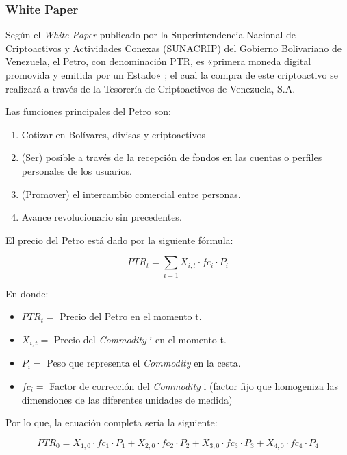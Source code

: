 \documentclass[12pt,a4paper,twoside]{book}
\begin{document}
\subsubsection{White Paper}
Según el \textit{White Paper} publicado por la Superintendencia Nacional de Criptoactivos y Actividades Conexas (SUNACRIP) del Gobierno Bolivariano de Venezuela, el Petro, con denominación PTR, es «primera moneda digital promovida y emitida por un Estado» \cite[pág. 1]{petro:whitepaper}; el cual la compra de este criptoactivo se realizará a través de la Tesorería de Criptoactivos de Venezuela, S.A.

Las funciones principales del Petro son:

\begin{enumerate}
\item Cotizar en Bolívares, divisas y criptoactivos
\item (Ser) posible a través de la recepción de fondos en las cuentas o perfiles personales de los usuarios.
\item (Promover) el intercambio comercial entre personas.
\item Avance revolucionario sin precedentes. \cite[pág. 4]{petro:whitepaper}
\end{enumerate}

El precio del Petro está dado por la siguiente fórmula:

\begin{equation}
PTR_{t} = \sum_{i=1} X_{i,t} \cdot fc_{i} \cdot P_{i}
\end{equation}

En donde:

\begin{itemize}
\item $ PTR_{t} = $ Precio del Petro en el momento t.
\item $ X_{i,t} = $ Precio del \textit{Commodity} i en el momento t.
\item $ P_{i} = $ Peso que representa el \textit{Commodity} en la cesta.
\item $ fc_{i} = $ Factor de corrección del \textit{Commodity} i (factor fijo que homogeniza las dimensiones de las diferentes unidades de medida)
\end{itemize}

Por lo que, la ecuación completa sería la siguiente:

\begin{equation*}
PTR_{0} = X_{1,0} \cdot fc_{1} \cdot P_{1} + X_{2,0} \cdot fc_{2} \cdot P_{2} + X_{3,0} \cdot fc_{3} \cdot P_{3} + X_{4,0} \cdot fc_{4} \cdot P_{4}
\end{equation*}
\end{document}

